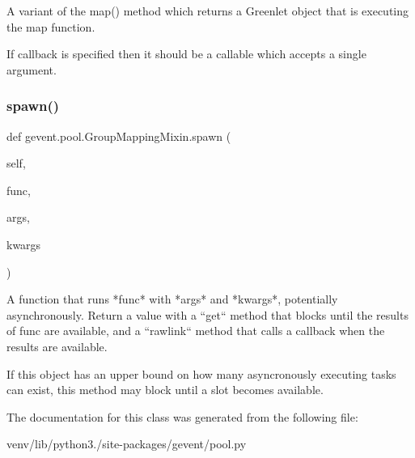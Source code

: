 \begin{DoxyVerb}A variant of the map() method which returns a Greenlet object that is executing
the map function.

If callback is specified then it should be a callable which accepts a
single argument.
\end{DoxyVerb}
 \mbox{\label{classgevent_1_1pool_1_1_group_mapping_mixin_aef5d85d8e23d7d009a47555e75040034}} 
\subsubsection{\texorpdfstring{spawn()}{spawn()}}
{\footnotesize\ttfamily def gevent.\+pool.\+Group\+Mapping\+Mixin.\+spawn (\begin{DoxyParamCaption}\item[{}]{self,  }\item[{}]{func,  }\item[{}]{args,  }\item[{}]{kwargs }\end{DoxyParamCaption})}

\begin{DoxyVerb}A function that runs *func* with *args* and *kwargs*, potentially
asynchronously. Return a value with a ``get`` method that blocks
until the results of func are available, and a ``rawlink`` method
that calls a callback when the results are available.

If this object has an upper bound on how many asyncronously executing
tasks can exist, this method may block until a slot becomes available.
\end{DoxyVerb}
 

The documentation for this class was generated from the following file\+:\begin{DoxyCompactItemize}
\item 
venv/lib/python3./site-\/packages/gevent/pool.\+py\end{DoxyCompactItemize}
